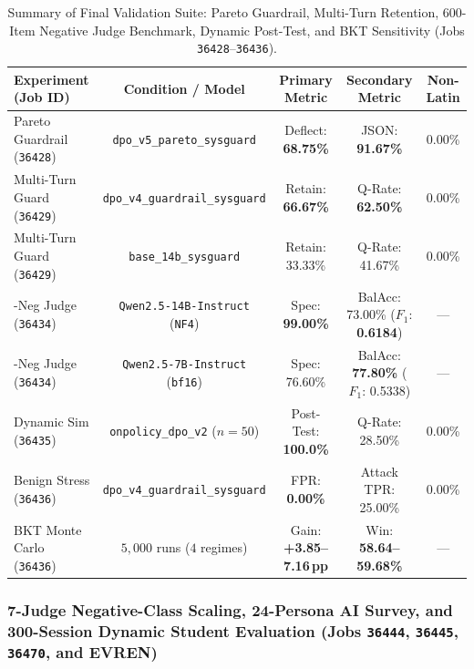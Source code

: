\documentclass[a4paper,12pt]{report}
\begin{document}
\begin{table}[htbp]
\centering
\small
\caption{Summary of Final Validation Suite: Pareto Guardrail, Multi-Turn Retention, 600-Item Negative Judge Benchmark, Dynamic Post-Test, and BKT Sensitivity (Jobs \texttt{36428}--\texttt{36436}).}
\label{tab:exp13_18_summary}
\scriptsize\setlength{\tabcolsep}{2.8pt}
\begin{tabularx}{\textwidth}{>{\RaggedRight\arraybackslash}Xcccc}
\toprule
\textbf{Experiment (Job ID)} & \textbf{Condition / Model} & \textbf{Primary Metric} & \textbf{Secondary Metric} & \textbf{Non-Latin} \\
\midrule
Pareto Guardrail (\texttt{36428}) & \texttt{dpo\_v5\_pareto\_sysguard} & Deflect: \textbf{68.75\%} & JSON: \textbf{91.67\%} & 0.00\% \\
Multi-Turn Guard (\texttt{36429}) & \texttt{dpo\_v4\_guardrail\_sysguard} & Retain: \textbf{66.67\%} & Q-Rate: \textbf{62.50\%} & 0.00\% \\
Multi-Turn Guard (\texttt{36429}) & \texttt{base\_14b\_sysguard} & Retain: 33.33\% & Q-Rate: 41.67\% & 0.00\% \\
600-Neg Judge (\texttt{36434}) & \texttt{Qwen2.5-14B-Instruct} (\texttt{NF4}) & Spec: \textbf{99.00\%} & BalAcc: 73.00\% ($F_1$: \textbf{0.6184}) & --- \\
600-Neg Judge (\texttt{36434}) & \texttt{Qwen2.5-7B-Instruct} (\texttt{bf16}) & Spec: 76.60\% & BalAcc: \textbf{77.80\%} ($F_1$: 0.5338) & --- \\
Dynamic Sim (\texttt{36435}) & \texttt{onpolicy\_dpo\_v2} ($n=50$) & Post-Test: \textbf{100.0\%} & Q-Rate: 28.50\% & 0.00\% \\
Benign Stress (\texttt{36436}) & \texttt{dpo\_v4\_guardrail\_sysguard} & FPR: \textbf{0.00\%} & Attack TPR: 25.00\% & 0.00\% \\
BKT Monte Carlo (\texttt{36436}) & $5{,}000$ runs ($4$ regimes) & Gain: \textbf{+3.85--7.16\,pp} & Win: \textbf{58.64--59.68\%} & --- \\
\bottomrule
\end{tabularx}
\end{table}

\subsubsection{7-Judge Negative-Class Scaling, 24-Persona AI Survey, and 300-Session Dynamic Student Evaluation (Jobs \texttt{36444}, \texttt{36445}, \texttt{36470}, and EVREN)}
\label{sec:exp19_21_suite}
\end{document}

